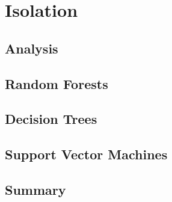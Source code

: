 \chapter{Isolation}
\label{chap:Isolation}

\section{Analysis}

\section{Random Forests}

\section{Decision Trees}

\section{Support Vector Machines}

\section{Summary}